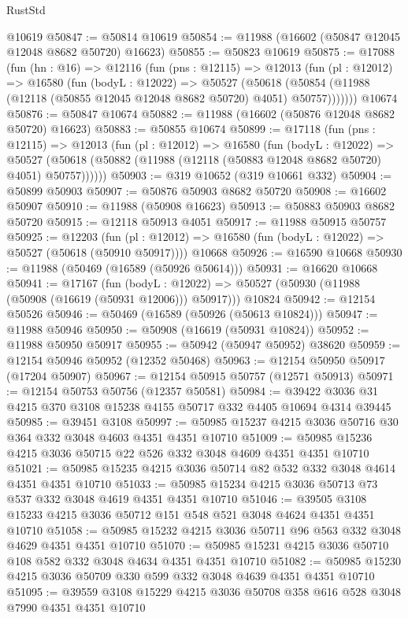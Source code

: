 \begin{lexlean}{RustStd}
\begin{coremodule}
    @10619
@50847 := @50814 @10619
@50854 := @11988 (@16602 (@50847 @12045 @12048 @8682 @50720) @16623)
@50855 := @50823 @10619
@50875 := @17088
    (fun (hn : @16) =>
    @12116
      (fun (pns : @12115) =>
      @12013
        (fun (pl : @12012) =>
        @16580
          (fun (bodyL : @12022) =>
          @50527
            (@50618 (@50854 (@11988 (@12118 (@50855 @12045 @12048 @8682 @50720) @4051) @50757)))))))
    @10674
@50876 := @50847 @10674
@50882 := @11988 (@16602 (@50876 @12048 @8682 @50720) @16623)
@50883 := @50855 @10674
@50899 := @17118
    (fun (pns : @12115) =>
    @12013
      (fun (pl : @12012) =>
      @16580
        (fun (bodyL : @12022) =>
        @50527 (@50618 (@50882 (@11988 (@12118 (@50883 @12048 @8682 @50720) @4051) @50757))))))
@50903 := @319 @10652 (@319 @10661 @332)
@50904 := @50899 @50903
@50907 := @50876 @50903 @8682 @50720
@50908 := @16602 @50907
@50910 := @11988 (@50908 @16623)
@50913 := @50883 @50903 @8682 @50720
@50915 := @12118 @50913 @4051
@50917 := @11988 @50915 @50757
@50925 := @12203
    (fun (pl : @12012) => @16580 (fun (bodyL : @12022) => @50527 (@50618 (@50910 @50917))))
    @10668
@50926 := @16590 @10668
@50930 := @11988 (@50469 (@16589 (@50926 @50614)))
@50931 := @16620 @10668
@50941 := @17167
    (fun (bodyL : @12022) => @50527 (@50930 (@11988 (@50908 (@16619 (@50931 @12006))) @50917)))
    @10824
@50942 := @12154 @50526
@50946 := @50469 (@16589 (@50926 (@50613 @10824)))
@50947 := @11988 @50946
@50950 := @50908 (@16619 (@50931 @10824))
@50952 := @11988 @50950 @50917
@50955 := @50942 (@50947 @50952) @38620
@50959 := @12154 @50946 @50952 (@12352 @50468)
@50963 := @12154 @50950 @50917 (@17204 @50907)
@50967 := @12154 @50915 @50757 (@12571 @50913)
@50971 := @12154 @50753 @50756 (@12357 @50581)
@50984 := @39422 @3036 @31 @4215 @370 @3108 @15238 @4155 @50717 @332 @4405 @10694 @4314 @39445
@50985 := @39451 @3108
@50997 := @50985 @15237 @4215 @3036 @50716 @30 @364 @332 @3048 @4603 @4351 @4351 @10710
@51009 := @50985 @15236 @4215 @3036 @50715 @22 @526 @332 @3048 @4609 @4351 @4351 @10710
@51021 := @50985 @15235 @4215 @3036 @50714 @82 @532 @332 @3048 @4614 @4351 @4351 @10710
@51033 := @50985 @15234 @4215 @3036 @50713 @73 @537 @332 @3048 @4619 @4351 @4351 @10710
@51046 := @39505 @3108 @15233 @4215 @3036 @50712 @151 @548 @521 @3048 @4624 @4351 @4351 @10710
@51058 := @50985 @15232 @4215 @3036 @50711 @96 @563 @332 @3048 @4629 @4351 @4351 @10710
@51070 := @50985 @15231 @4215 @3036 @50710 @108 @582 @332 @3048 @4634 @4351 @4351 @10710
@51082 := @50985 @15230 @4215 @3036 @50709 @330 @599 @332 @3048 @4639 @4351 @4351 @10710
@51095 := @39559 @3108 @15229 @4215 @3036 @50708 @358 @616 @528 @3048 @7990 @4351 @4351 @10710

\end{coremodule}
\end{lexlean}
